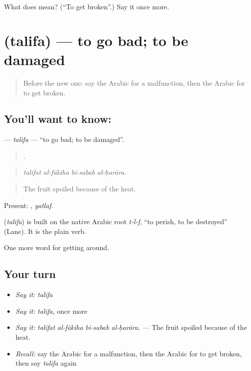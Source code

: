 \begin{tcolorbox}[breakable,colback=teal!4,colframe=teal!35!black,title={Before you move on}]
What does  mean? (\textquotedblleft{}To get broken\textquotedblright{}.) Say it once more.
\end{tcolorbox}
\section[\texorpdfstring{\ar{تلف} (talifa)}{تلف (talifa)}]{ (talifa) — to go bad; to be damaged}

\label{lesson:AR-C460-talifa}



\begin{quote}
Before the new one: say the Arabic for a malfunction, then the Arabic for to get broken.
\end{quote}

\subsection*{You'll want to know: }
\textbf{} — \emph{talifa} — \textquotedblleft{}to go bad; to be damaged\textquotedblright{}.

\begin{quote}
   .
\end{quote}

\begin{quote}
\emph{talifat al-fākiha bi-sabab al-ḥarāra.}
\end{quote}

\begin{quote}
The fruit spoiled because of the heat.
\end{quote}

Present: , \emph{yatlaf}.

\begin{cousinweb}
\textbf{} (\emph{talifa}) is built on the native Arabic root \emph{t-l-f}, \textquotedblleft{}to perish, to be destroyed\textquotedblright{} (Lane). It is the plain verb.
\end{cousinweb}

\begin{grammarlens}[title={What you've built}]
One more word for getting around.
\end{grammarlens}

\subsection*{Your turn}
\begin{itemize}
\raggedright
  \item \emph{Say it:} \emph{talifa}
  \item \emph{Say it:} \emph{talifa}, once more
  \item \emph{Say it:} \emph{talifat al-fākiha bi-sabab al-ḥarāra.} — The fruit spoiled because of the heat.
  \item \emph{Recall:} say the Arabic for a malfunction, then the Arabic for to get broken, then say \emph{talifa} again
\end{itemize}

